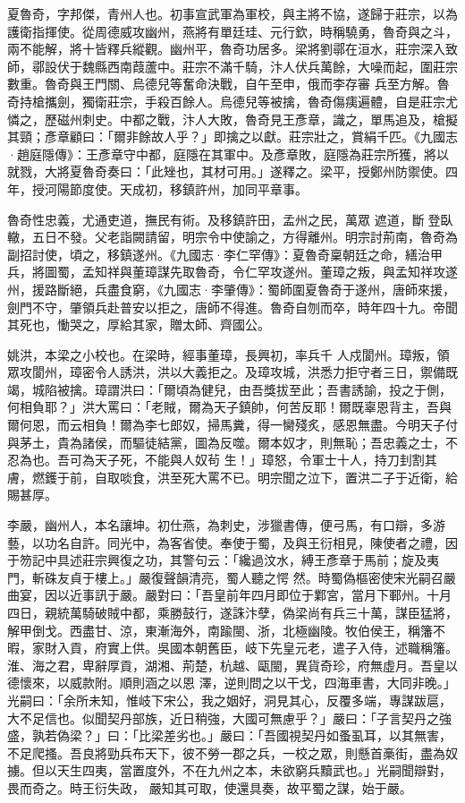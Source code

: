 \begin{pinyinscope}
 夏魯奇，字邦傑，青州人也。初事宣武軍為軍校，與主將不協，遂歸于莊宗，以為護衛指揮使。從周德威攻幽州，燕將有單廷珪、元行欽，時稱驍勇，魯奇與之斗，兩不能解，將十皆釋兵縱觀。幽州平，魯奇功居多。梁將劉鄩在洹水，莊宗深入致師，鄩設伏于魏縣西南葭蘆中。莊宗不滿千騎，汴人伏兵萬餘，大噪而起，圍莊宗數重。魯奇與王門關、烏德兒等奮命決戰，自午至申，俄而李存審
 兵至方解。魯奇持槍攜劍，獨衛莊宗，手殺百餘人。烏德兒等被擒，魯奇傷痍遍體，自是莊宗尤憐之，歷磁州刺史。中都之戰，汴人大敗，魯奇見王彥章，識之，單馬追及，槍擬其頸；彥章顧曰：「爾非餘故人乎？」即擒之以獻。莊宗壯之，賞絹千匹。《九國志·趙庭隱傳》：王彥章守中都，庭隱在其軍中。及彥章敗，庭隱為莊宗所獲，將以就戮，大將夏魯奇奏曰：「此矬也，其材可用。」遂釋之。梁平，授鄭州防禦使。四年，授河陽節度使。天成初，移鎮許州，加同平章事。



 魯奇性忠義，尤通吏道，撫民有術。及移鎮許田，孟州之民，萬眾
 遮道，斷登臥轍，五日不發。父老詣闕請留，明宗令中使諭之，方得離州。明宗討荊南，魯奇為副招討使，頃之，移鎮遂州。《九國志·李仁罕傳》：夏魯奇稟朝廷之命，繕治甲兵，將圖蜀，孟知祥與董璋謀先取魯奇，令仁罕攻遂州。董璋之叛，與孟知祥攻遂州，援路斷絕，兵盡食窮，《九國志·李肇傳》：蜀師圍夏魯奇于遂州，唐師來援，劍門不守，肇領兵赴普安以拒之，唐師不得進。魯奇自刎而卒，時年四十九。帝聞其死也，慟哭之，厚給其家，贈太師、齊國公。



 姚洪，本梁之小校也。在梁時，經事董璋，長興初，率兵千
 人戍閬州。璋叛，領眾攻閬州，璋密令人誘洪，洪以大義拒之。及璋攻城，洪悉力拒守者三日，禦備既竭，城陷被擒。璋謂洪曰：「爾頃為健兒，由吾獎拔至此；吾書誘諭，投之于側，何相負耶？」洪大罵曰：「老賊，爾為天子鎮帥，何苦反耶！爾既辜恩背主，吾與爾何恩，而云相負！爾為李七郎奴，掃馬糞，得一臠殘炙，感恩無盡。今明天子付與茅土，貴為諸侯，而驅徒結黨，圖為反噬。爾本奴才，則無恥；吾忠義之士，不忍為也。吾可為天子死，不能與人奴茍
 生！」璋怒，令軍士十人，持刀刲割其膚，燃鑊于前，自取啖食，洪至死大罵不已。明宗聞之泣下，置洪二子于近衛，給賜甚厚。



 李嚴，幽州人，本名讓坤。初仕燕，為刺史，涉獵書傳，便弓馬，有口辯，多游藝，以功名自許。同光中，為客省使。奉使于蜀，及與王衍相見，陳使者之禮，因于笏記中具述莊宗興復之功，其警句云：「纔過汶水，縛王彥章于馬前；旋及夷門，斬硃友貞于樓上。」嚴復聲韻清亮，蜀人聽之愕
 然。時蜀偽樞密使宋光嗣召嚴曲宴，因以近事訊于嚴。嚴對曰：「吾皇前年四月即位于鄴宮，當月下鄆州。十月四日，親統萬騎破賊中都，乘勝鼓行，遂誅汴孽，偽梁尚有兵三十萬，謀臣猛將，解甲倒戈。西盡甘、涼，東漸海外，南踰閩、浙，北極幽陵。牧伯侯王，稱籓不暇，家財入貢，府實上供。吳國本朝舊臣，岐下先皇元老，遣子入侍，述職稱籓。淮、海之君，卑辭厚貢，湖湘、荊楚，杭越、甌閩，異貨奇珍，府無虛月。吾皇以德懷來，以威款附。順則涵之以恩
 澤，逆則問之以干戈，四海車書，大同非晚。」光嗣曰：「余所未知，惟岐下宋公，我之姻好，洞見其心，反覆多端，專謀跋扈，大不足信也。似聞契丹部族，近日稍強，大國可無慮乎？」嚴曰：「子言契丹之強盛，孰若偽梁？」曰：「比梁差劣也。」嚴曰：「吾國視契丹如蚤虱耳，以其無害，不足爬搔。吾良將勁兵布天下，彼不勞一郡之兵，一校之眾，則懸首槀街，盡為奴擄。但以天生四夷，當置度外，不在九州之本，未欲窮兵黷武也。」光嗣聞辯對，畏而奇之。時王衍失政，
 嚴知其可取，使還具奏，故平蜀之謀，始于嚴。




\end{pinyinscope}
